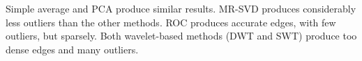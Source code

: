 \documentclass[journal]{IEEEtran}
\begin{document}
Simple average and PCA produce similar results.
MR-SVD produces considerably less outliers than the other methods.
ROC produces accurate edges, with few outliers, but sparsely. 
Both wavelet-based methods (DWT and SWT) produce too dense edges and many outliers.


\begin{figure}[hbt]
	\centering
     \\

\end{figure}
\end{document}

